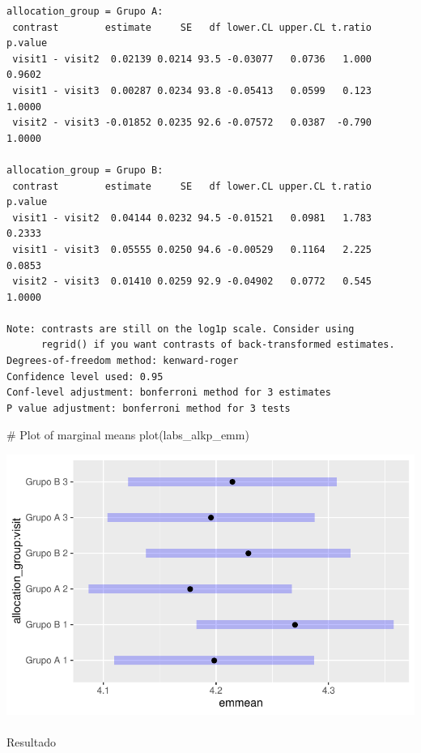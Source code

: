 \documentclass[
  12pt,
]{article}
\makeatletter
\let\oldparagraph\paragraph
\renewcommand{\paragraph}{
    \@ifstar
      \xxxParagraphStar
      \xxxParagraphNoStar
  }
\newcommand{\xxxParagraphStar}[1]{\oldparagraph*{#1}\mbox{}}
\newcommand{\xxxParagraphNoStar}[1]{\oldparagraph{#1}\mbox{}}
\newenvironment{Shaded}{\begin{snugshade}}{\end{snugshade}}
\newcommand{\CommentTok}[1]{\textcolor[rgb]{0.37,0.37,0.37}{#1}}
\newcommand{\FunctionTok}[1]{\textcolor[rgb]{0.28,0.35,0.67}{#1}}
\newcommand{\NormalTok}[1]{\textcolor[rgb]{0.00,0.23,0.31}{#1}}
\makeatother
\begin{document}
\begin{verbatim}
allocation_group = Grupo A:
 contrast        estimate     SE   df lower.CL upper.CL t.ratio p.value
 visit1 - visit2  0.02139 0.0214 93.5 -0.03077   0.0736   1.000  0.9602
 visit1 - visit3  0.00287 0.0234 93.8 -0.05413   0.0599   0.123  1.0000
 visit2 - visit3 -0.01852 0.0235 92.6 -0.07572   0.0387  -0.790  1.0000

allocation_group = Grupo B:
 contrast        estimate     SE   df lower.CL upper.CL t.ratio p.value
 visit1 - visit2  0.04144 0.0232 94.5 -0.01521   0.0981   1.783  0.2333
 visit1 - visit3  0.05555 0.0250 94.6 -0.00529   0.1164   2.225  0.0853
 visit2 - visit3  0.01410 0.0259 92.9 -0.04902   0.0772   0.545  1.0000

Note: contrasts are still on the log1p scale. Consider using
      regrid() if you want contrasts of back-transformed estimates. 
Degrees-of-freedom method: kenward-roger 
Confidence level used: 0.95 
Conf-level adjustment: bonferroni method for 3 estimates 
P value adjustment: bonferroni method for 3 tests 
\end{verbatim}

\begin{Shaded}
\begin{Highlighting}[]
\CommentTok{\# Plot of marginal means}
\FunctionTok{plot}\NormalTok{(labs\_alkp\_emm)}
\end{Highlighting}
\end{Shaded}

\includegraphics{Outcomes_files/figure-pdf/labs_alkp_sens_emm-1.pdf}

\paragraph{Resultado}\label{resultado-3}
\end{document}
